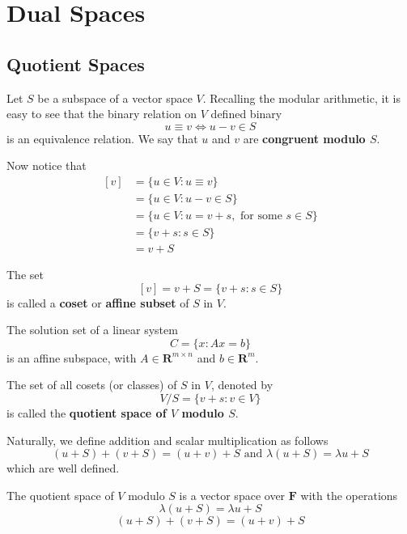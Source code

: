 \chapter{Dual Spaces}

\section{Quotient Spaces}

Let $S$ be a subspace of a vector space $V$. Recalling the modular arithmetic, it is easy to see that the binary relation on $V$ defined binary
\[
	u \equiv v \iff u-v \in S
\]
is an equivalence relation. We say that $u$ and $v$ are \textbf{congruent modulo $S$}.

Now notice that
\begin{equation*}
	\begin{aligned}
		[v] &= \{ u \in V : u \equiv v \} \\
			&= \{ u \in V : u-v \in S \} \\
			&= \{ u \in V : u = v+s, \text{ for some } s \in S \} \\
			&= \{ v + s : s \in S \} \\
			&= v + S
	\end{aligned}
\end{equation*}

The set
\[
	[v] = v + S = \{ v+s : s \in S \}
\]
is called a \textbf{coset} or \textbf{affine subset} of $S$ in $V$.

\begin{example}
	The solution set of a linear system 
	\[
		C = \{ x : Ax = b \}
	\]
	is an affine subspace, with $A \in \textbf{R}^{m \times n}$ and $b \in \textbf{R}^m$.
\end{example}

\begin{definition}
	The set of all cosets (or classes) of $S$ in $V$, denoted by
\[
	V / S = \{ v+s : v \in V \}
\]
is called the \textbf{quotient space of $V$ modulo $S$}.
\end{definition}

Naturally, we define addition and scalar multiplication as follows
\[
	(u + S) + (v + S) = (u + v) + S \text{ and } \lambda(u+S) = \lambda u + S
\]
which are well defined.

\begin{theorem}
	The quotient space of $V$ modulo $S$ is a vector space over $\textbf{F}$ with the operations
	\[
		\lambda(u + S) = \lambda u + S
	\]
	\[
		(u + S) + (v + S) = (u + v) + S
	\]
\end{theorem}

